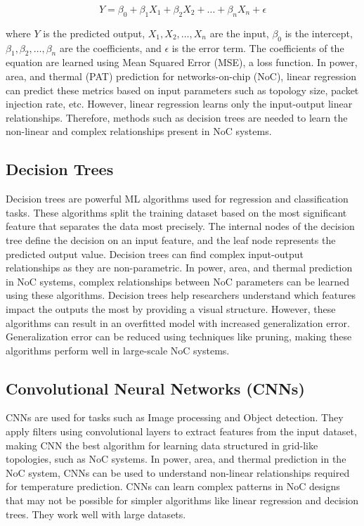 \documentclass[conference]{IEEEtran}
\begin{document}
\[
Y = \beta_0 + \beta_1 X_1 + \beta_2 X_2 + \dots + \beta_n X_n + \epsilon
\]

where \( Y \) is the predicted output, \( X_1, X_2, \dots, X_n \) are the input, \( \beta_0 \) is the intercept, \( \beta_1, \beta_2, \dots, \beta_n \) are the coefficients, and \( \epsilon \) is the error term. The coefficients of the equation are learned using Mean Squared Error (MSE), a loss function. In power, area, and thermal (PAT) prediction for networks-on-chip (NoC), linear regression can predict these metrics based on input parameters such as topology size, packet injection rate, etc. However, linear regression learns only the input-output linear relationships. Therefore, methods such as decision trees are needed to learn the non-linear and complex relationships present in NoC systems.

\subsection{Decision Trees}

Decision trees are powerful ML algorithms used for regression and classification tasks. These algorithms split the training dataset based on the most significant feature that separates the data most precisely. The internal nodes of the decision tree define the decision on an input feature, and the leaf node represents the predicted output value. Decision trees can find complex input-output relationships as they are non-parametric. In power, area, and thermal prediction in NoC systems, complex relationships between NoC parameters can be learned using these algorithms. Decision trees help researchers understand which features impact the outputs the most by providing a visual structure. However, these algorithms can result in an overfitted model with increased generalization error. Generalization error can be reduced using techniques like pruning, making these algorithms perform well in large-scale NoC systems.

\subsection{Convolutional Neural Networks (CNNs)}

CNNs are used for tasks such as Image processing and Object detection. They apply filters using convolutional layers to extract features from the input dataset, making CNN the best algorithm for learning data structured in grid-like topologies, such as NoC systems. In power, area, and thermal prediction in the NoC system, CNNs can be used to understand non-linear relationships required for temperature prediction. CNNs can learn complex patterns in NoC designs that may not be possible for simpler algorithms like linear regression and decision trees. They work well with large datasets.
\end{document}
